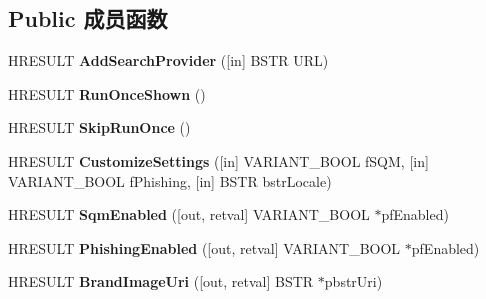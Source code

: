 \subsection*{Public 成员函数}
\begin{DoxyCompactItemize}
\item 
\mbox{\label{interface_s_h_doc_vw_1_1_i_shell_u_i_helper2_acbb941282fd32752e0c579c313fd2969}} 
H\+R\+E\+S\+U\+LT {\bfseries Add\+Search\+Provider} (\mbox{[}in\mbox{]} B\+S\+TR U\+RL)
\item 
\mbox{\label{interface_s_h_doc_vw_1_1_i_shell_u_i_helper2_a80f5a316343c36af3f14557e473ba408}} 
H\+R\+E\+S\+U\+LT {\bfseries Run\+Once\+Shown} ()
\item 
\mbox{\label{interface_s_h_doc_vw_1_1_i_shell_u_i_helper2_aac5753a0d8e37a6bf7ac6aa7ba8c77c4}} 
H\+R\+E\+S\+U\+LT {\bfseries Skip\+Run\+Once} ()
\item 
\mbox{\label{interface_s_h_doc_vw_1_1_i_shell_u_i_helper2_a7e58890230e8aab009617e599fa83068}} 
H\+R\+E\+S\+U\+LT {\bfseries Customize\+Settings} (\mbox{[}in\mbox{]} V\+A\+R\+I\+A\+N\+T\+\_\+\+B\+O\+OL f\+S\+QM, \mbox{[}in\mbox{]} V\+A\+R\+I\+A\+N\+T\+\_\+\+B\+O\+OL f\+Phishing, \mbox{[}in\mbox{]} B\+S\+TR bstr\+Locale)
\item 
\mbox{\label{interface_s_h_doc_vw_1_1_i_shell_u_i_helper2_ab444fb2db3e5fee8eb2fe39a052c113a}} 
H\+R\+E\+S\+U\+LT {\bfseries Sqm\+Enabled} (\mbox{[}out, retval\mbox{]} V\+A\+R\+I\+A\+N\+T\+\_\+\+B\+O\+OL $\ast$pf\+Enabled)
\item 
\mbox{\label{interface_s_h_doc_vw_1_1_i_shell_u_i_helper2_ae599db1c4eac385ed81d9e5432c1534e}} 
H\+R\+E\+S\+U\+LT {\bfseries Phishing\+Enabled} (\mbox{[}out, retval\mbox{]} V\+A\+R\+I\+A\+N\+T\+\_\+\+B\+O\+OL $\ast$pf\+Enabled)
\item 
\mbox{\label{interface_s_h_doc_vw_1_1_i_shell_u_i_helper2_a89dfe4b190a1587703a76bde81047d18}} 
H\+R\+E\+S\+U\+LT {\bfseries Brand\+Image\+Uri} (\mbox{[}out, retval\mbox{]} B\+S\+TR $\ast$pbstr\+Uri)

\end{DoxyCompactItemize}
